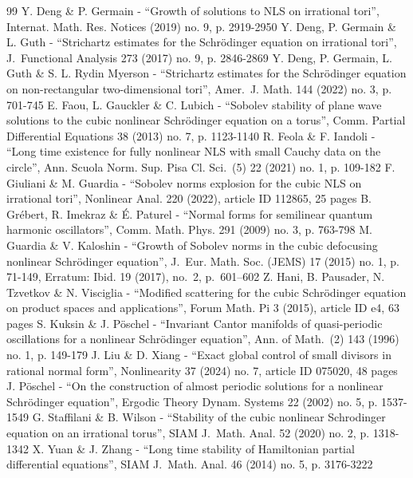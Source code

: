 \begin{thebibliography}{99}
 Y. Deng \& P. Germain - “Growth of solutions to NLS on irrational tori”, Internat. Math. Res. Notices (2019) no. 9, p. 2919-2950
 Y. Deng, P. Germain \& L. Guth - “Strichartz estimates for the Schrödinger equation on irrational tori”, J. Functional Analysis 273 (2017) no. 9, p. 2846-2869
 Y. Deng, P. Germain, L. Guth \& S. L. Rydin Myerson - “Strichartz estimates for the Schrödinger equation on non-rectangular two-dimensional tori”, Amer. J. Math. 144 (2022) no. 3, p. 701-745
 E. Faou, L. Gauckler \& C. Lubich - “Sobolev stability of plane wave solutions to the cubic nonlinear Schrödinger equation on a torus”, Comm. Partial Differential Equations 38 (2013) no. 7, p. 1123-1140
 R. Feola \& F. Iandoli - “Long time existence for fully nonlinear NLS with small Cauchy data on the circle”, Ann. Scuola Norm. Sup. Pisa Cl. Sci. (5) 22 (2021) no. 1, p. 109-182
 F. Giuliani \& M. Guardia - “Sobolev norms explosion for the cubic NLS on irrational tori”, Nonlinear Anal. 220 (2022), article ID 112865, 25 pages
 B. Grébert, R. Imekraz \& É. Paturel - “Normal forms for semilinear quantum harmonic oscillators”, Comm. Math. Phys. 291 (2009) no. 3, p. 763-798
 M. Guardia \& V. Kaloshin - “Growth of Sobolev norms in the cubic defocusing nonlinear Schrödinger equation”, J. Eur. Math. Soc. (JEMS) 17 (2015) no. 1, p. 71-149, Erratum: Ibid. 19 (2017), no. 2, p. 601–602
 Z. Hani, B. Pausader, N. Tzvetkov \& N. Visciglia - “Modified scattering for the cubic Schrödinger equation on product spaces and applications”, Forum Math. Pi 3 (2015), article ID e4, 63 pages
 S. Kuksin \& J. Pöschel - “Invariant Cantor manifolds of quasi-periodic oscillations for a nonlinear Schrödinger equation”, Ann. of Math. (2) 143 (1996) no. 1, p. 149-179
 J. Liu \& D. Xiang - “Exact global control of small divisors in rational normal form”, Nonlinearity 37 (2024) no. 7, article ID 075020, 48 pages
 J. Pöschel - “On the construction of almost periodic solutions for a nonlinear Schrödinger equation”, Ergodic Theory Dynam. Systems 22 (2002) no. 5, p. 1537-1549
 G. Staffilani \& B. Wilson - “Stability of the cubic nonlinear Schrodinger equation on an irrational torus”, SIAM J. Math. Anal. 52 (2020) no. 2, p. 1318-1342
 X. Yuan \& J. Zhang - “Long time stability of Hamiltonian partial differential equations”, SIAM J. Math. Anal. 46 (2014) no. 5, p. 3176-3222
\end{thebibliography}
